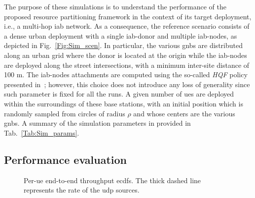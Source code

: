The purpose of these simulations is to understand the performance of the proposed resource partitioning framework in the context of its target deployment, i.e., a multi-hop \gls{iab} network. As a consequence, the reference scenario consists of a dense urban deployment with a single \gls{iab}-donor and multiple \gls{iab}-nodes, as depicted in Fig.~\ref{Fig:Sim_scen}. In particular, the various \glspl{gnb} are distributed along an urban grid where the donor is located at the origin while the \gls{iab}-nodes are deployed along the street intersections, with a minimum inter-site distance of 100 m. The \gls{iab}-nodes attachments are computed using the so-called \textit{HQF} policy presented in~\cite{polese2018iab}; however, this choice does not introduce any loss of generality since such parameter is fixed for all the runs. A given number of \glspl{ue} are deployed within the surroundings of these base stations, with an initial position which is randomly sampled from circles of radius $\rho$ and whose centers are the various \glspl{gnb}. A summary of the simulation parameters in provided in Tab.~\ref{Tab:Sim_params}.


\subsection{Performance evaluation}
\label{Sec:perf_eval}

\begin{figure}[tbp]
	\centering
  	\hfill
    \caption{Per-\gls{ue} end-to-end throughput \glspl{ecdf}. The thick dashed line represents the rate of the \gls{udp} sources.}
    \label{Fig:thr_ECDF}   
    \vspace{-.6cm} 
\end{figure}

